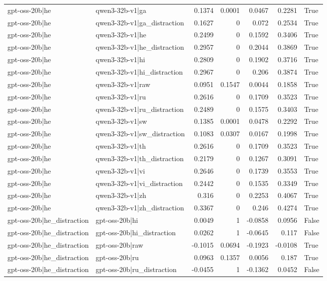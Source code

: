 \begin{table}
\begin{tabular}{l l r r r r l}
gpt-oss-20b|he & qwen3-32b-v1|ga & 0.1374 & 0.0001 & 0.0467 & 0.2281 & True \\
gpt-oss-20b|he & qwen3-32b-v1|ga_distraction & 0.1627 & 0 & 0.072 & 0.2534 & True \\
gpt-oss-20b|he & qwen3-32b-v1|he & 0.2499 & 0 & 0.1592 & 0.3406 & True \\
gpt-oss-20b|he & qwen3-32b-v1|he_distraction & 0.2957 & 0 & 0.2044 & 0.3869 & True \\
gpt-oss-20b|he & qwen3-32b-v1|hi & 0.2809 & 0 & 0.1902 & 0.3716 & True \\
gpt-oss-20b|he & qwen3-32b-v1|hi_distraction & 0.2967 & 0 & 0.206 & 0.3874 & True \\
gpt-oss-20b|he & qwen3-32b-v1|raw & 0.0951 & 0.1547 & 0.0044 & 0.1858 & True \\
gpt-oss-20b|he & qwen3-32b-v1|ru & 0.2616 & 0 & 0.1709 & 0.3523 & True \\
gpt-oss-20b|he & qwen3-32b-v1|ru_distraction & 0.2489 & 0 & 0.1575 & 0.3403 & True \\
gpt-oss-20b|he & qwen3-32b-v1|sw & 0.1385 & 0.0001 & 0.0478 & 0.2292 & True \\
gpt-oss-20b|he & qwen3-32b-v1|sw_distraction & 0.1083 & 0.0307 & 0.0167 & 0.1998 & True \\
gpt-oss-20b|he & qwen3-32b-v1|th & 0.2616 & 0 & 0.1709 & 0.3523 & True \\
gpt-oss-20b|he & qwen3-32b-v1|th_distraction & 0.2179 & 0 & 0.1267 & 0.3091 & True \\
gpt-oss-20b|he & qwen3-32b-v1|vi & 0.2646 & 0 & 0.1739 & 0.3553 & True \\
gpt-oss-20b|he & qwen3-32b-v1|vi_distraction & 0.2442 & 0 & 0.1535 & 0.3349 & True \\
gpt-oss-20b|he & qwen3-32b-v1|zh & 0.316 & 0 & 0.2253 & 0.4067 & True \\
gpt-oss-20b|he & qwen3-32b-v1|zh_distraction & 0.3367 & 0 & 0.246 & 0.4274 & True \\
gpt-oss-20b|he_distraction & gpt-oss-20b|hi & 0.0049 & 1 & -0.0858 & 0.0956 & False \\
gpt-oss-20b|he_distraction & gpt-oss-20b|hi_distraction & 0.0262 & 1 & -0.0645 & 0.117 & False \\
gpt-oss-20b|he_distraction & gpt-oss-20b|raw & -0.1015 & 0.0694 & -0.1923 & -0.0108 & True \\
gpt-oss-20b|he_distraction & gpt-oss-20b|ru & 0.0963 & 0.1357 & 0.0056 & 0.187 & True \\
gpt-oss-20b|he_distraction & gpt-oss-20b|ru_distraction & -0.0455 & 1 & -0.1362 & 0.0452 & False \\

\end{tabular}
\end{table}
